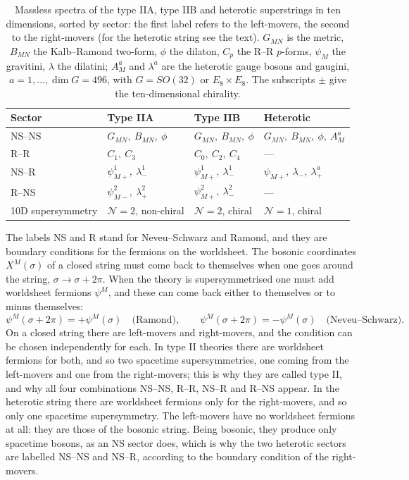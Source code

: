 \begin{table}[tbp]
  \centering
  \renewcommand{\arraystretch}{1.35}
  \begin{tabular}{@{}llll@{}}
    \toprule
    Sector & Type IIA & Type IIB & Heterotic \\
    \midrule
    NS--NS & $G_{MN},\ B_{MN},\ \phi$ & $G_{MN},\ B_{MN},\ \phi$ & $G_{MN},\ B_{MN},\ \phi,\ A^a_M$ \\
    R--R   & $C_1,\ C_3$ & $C_0,\ C_2,\ C_4$ & --- \\
    NS--R  & $\psi^1_{M+},\ \lambda^1_-$ & $\psi^1_{M+},\ \lambda^1_-$ & $\psi_{M+},\ \lambda_-,\ \lambda^a_+$ \\
    R--NS  & $\psi^2_{M-},\ \lambda^2_+$ & $\psi^2_{M+},\ \lambda^2_-$ & --- \\
    \midrule
    10D supersymmetry & $\mathcal N=2$, non-chiral & $\mathcal N=2$, chiral & $\mathcal N=1$, chiral \\
    \bottomrule
  \end{tabular}
  \caption{Massless spectra of the type IIA, type IIB and heterotic superstrings in ten dimensions, sorted by sector: the first label refers to the left-movers, the second to the right-movers (for the heterotic string see the text). $G_{MN}$ is the metric, $B_{MN}$ the Kalb--Ramond two-form, $\phi$ the dilaton, $C_p$ the R--R $p$-forms, $\psi_M$ the gravitini, $\lambda$ the dilatini; $A^a_M$ and $\lambda^a$ are the heterotic gauge bosons and gaugini, $a = 1,\dots,\dim G = 496$, with $G = SO(32)$ or $E_8\times E_8$. The subscripts $\pm$ give the ten-dimensional chirality.}
  \label{tab:L2-spectra}
\end{table}

The labels NS and R stand for Neveu--Schwarz and Ramond, and they are boundary conditions for the fermions on the worldsheet. The bosonic coordinates $X^M(\sigma)$ of a closed string must come back to themselves when one goes around the string, $\sigma\to\sigma+2\pi$. When the theory is supersymmetrised one must add worldsheet fermions $\psi^M$, and these can come back either to themselves or to minus themselves:
\begin{equation}
  \psi^M(\sigma+2\pi) = +\psi^M(\sigma)\quad\text{(Ramond)} ,\qquad
  \psi^M(\sigma+2\pi) = -\psi^M(\sigma)\quad\text{(Neveu--Schwarz)} .
  \label{eq:L2-NSR}
\end{equation}
On a closed string there are left-movers and right-movers, and the condition can be chosen independently for each. In type II theories there are worldsheet fermions for both, and so two spacetime supersymmetries, one coming from the left-movers and one from the right-movers; this is why they are called type II, and why all four combinations NS--NS, R--R, NS--R and R--NS appear. In the heterotic string there are worldsheet fermions only for the right-movers, and so only one spacetime supersymmetry. The left-movers have no worldsheet fermions at all: they are those of the bosonic string. Being bosonic, they produce only spacetime bosons, as an NS sector does, which is why the two heterotic sectors are labelled NS--NS and NS--R, according to the boundary condition of the right-movers.


